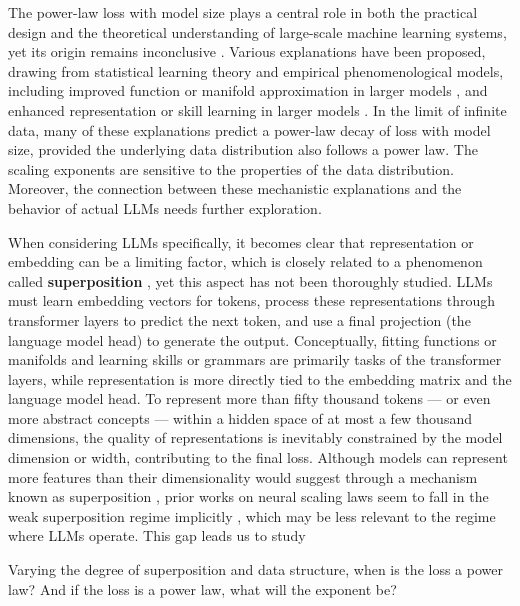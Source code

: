 \documentclass{article}
\begin{document}
The power-law loss with model size plays a central role in both the practical design and the theoretical understanding of large-scale machine learning systems, yet its origin remains inconclusive \cite{hoffmann2022chinchilla, sharma2022neural,bahri2024explaining,bordelon2020spectrum,bordelon2025feature,maloney2022solvable,hutter2021learning,michaud2023quantization,liu2025physicsskilllearning,hernandez2022scaling,brill2024unifying,spigler2020asymptotic,song2024resourcemodelneuralscaling}. Various explanations have been proposed, drawing from statistical learning theory and empirical phenomenological models, including improved function or manifold approximation in larger models \cite{sharma2022neural,bahri2024explaining}, and enhanced representation or skill learning in larger models \cite{hutter2021learning,michaud2023quantization,liu2025physicsskilllearning,hernandez2022scaling}. In the limit of infinite data, many of these explanations predict a power-law decay of loss with model size, provided the underlying data distribution also follows a power law. The scaling exponents are sensitive to the properties of the data distribution. Moreover, the connection between these mechanistic explanations and the behavior of actual LLMs needs further exploration.

When considering LLMs specifically, it becomes clear that representation or embedding can be a limiting factor, which is closely related to a phenomenon called \textbf{superposition} \cite{arora2018linearalgebraicstructureword,elhage2022superposition}, yet this aspect has not been thoroughly studied. LLMs must learn embedding vectors for tokens, process these representations through transformer layers to predict the next token, and use a final projection (the language model head) to generate the output. Conceptually, fitting functions or manifolds and learning skills or grammars are primarily tasks of the transformer layers, while representation is more directly tied to the embedding matrix and the language model head. To represent more than fifty thousand tokens --- or even more abstract concepts --- within a hidden space of at most a few thousand dimensions, the quality of representations is inevitably constrained by the model dimension or width, contributing to the final loss. Although models can represent more features than their dimensionality would suggest through a mechanism known as superposition \cite{elhage2022superposition}, prior works on neural scaling laws seem to fall in the weak superposition regime implicitly \cite{bahri2024explaining,bordelon2020spectrum,bordelon2025feature,maloney2022solvable,hutter2021learning,michaud2023quantization}, which may be less relevant to the regime where LLMs operate. This gap leads us to study
\begin{tcolorbox}[colframe=mitred, opacityback=0.9, title=Question: How will superposition influence the loss scaling with model dimension (width)?]
Varying the degree of superposition and data structure, when is the loss a power law? And if the loss is a power law, what will the exponent be?
\end{tcolorbox}
\end{document}
